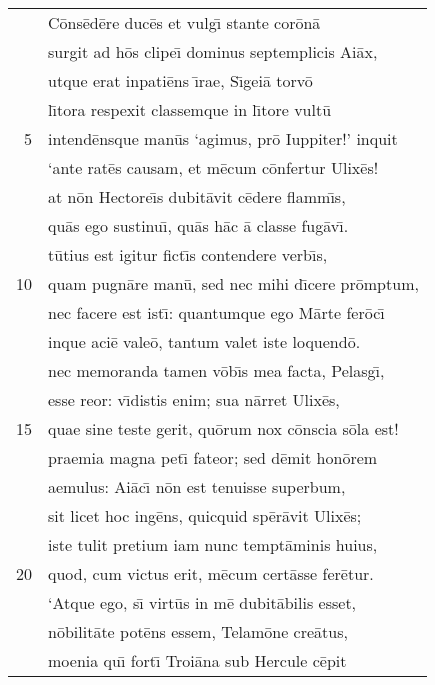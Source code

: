 \documentclass[paper=6in:9in,pagesize=pdftex,
               headinclude=on,footinclude=on,12pt]{scrbook}
\begin{document}

\begin{longtable}[p]{ r l }
 & \indent C\=ons\=ed\=ere duc\=es et vulg\={\i} stante cor\=on\=a\\ 
 & surgit ad h\=os clipe\={\i} dominus septemplicis Ai\=ax,\\ 
 & utque erat inpati\=ens \={\i}rae, S\={\i}gei\=a torv\=o\\ 
 & l\={\i}tora respexit classemque in l\={\i}tore vult\=u\\ 
5 & intend\=ensque man\=us `agimus, pr\=o Iuppiter!' inquit\\ 
 & `ante rat\=es causam, et m\=ecum c\=onfertur Ulix\=es!\\ 
 & at n\=on Hectore\={\i}s dubit\=avit c\=edere flamm\={\i}s,\\ 
 & qu\=as ego sustinu\={\i}, qu\=as h\=ac \=a classe fug\=av\={\i}.\\ 
 & t\=utius est igitur fict\={\i}s contendere verb\={\i}s,\\ 
10 & quam pugn\=are man\=u, sed nec mihi d\={\i}cere pr\=omptum,\\ 
 & nec facere est ist\={\i}: quantumque ego M\=arte fer\=oc\={\i}\\ 
 & inque aci\=e vale\=o, tantum valet iste loquend\=o.\\ 
 & nec memoranda tamen v\=ob\={\i}s mea facta, Pelasg\={\i},\\ 
 & esse reor: v\={\i}distis enim; sua n\=arret Ulix\=es,\\ 
15 & quae sine teste gerit, qu\=orum nox c\=onscia s\=ola est!\\ 
 & praemia magna pet\={\i} fateor; sed d\=emit hon\=orem\\ 
 & aemulus: Ai\=ac\={\i} n\=on est tenuisse superbum,\\ 
 & sit licet hoc ing\=ens, quicquid sp\=er\=avit Ulix\=es;\\ 
 & iste tulit pretium iam nunc tempt\=aminis huius,\\ 
20 & quod, cum victus erit, m\=ecum cert\=asse fer\=etur.\\ 
 & \indent `Atque ego, s\={\i} virt\=us in m\=e dubit\=abilis esset,\\ 
 & n\=obilit\=ate pot\=ens essem, Telam\=one cre\=atus,\\ 
 & moenia qu\={\i} fort\={\i} Troi\=ana sub Hercule c\=epit\\ 

\end{longtable}
\end{document}
